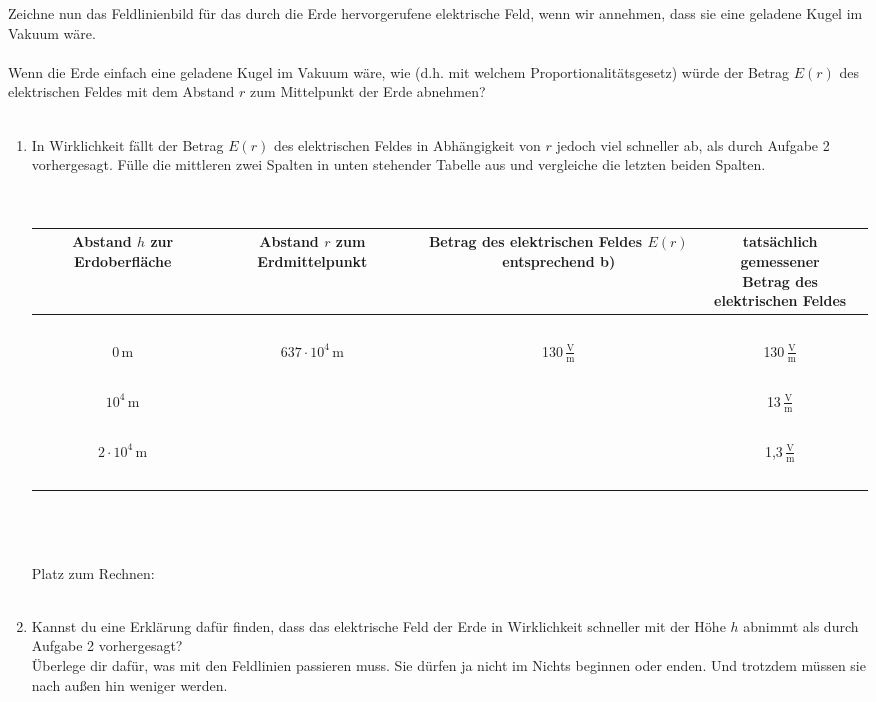 \documentclass[task=1]{exercise}
\begin{document}
  
  Zeichne nun das Feldlinienbild für das durch die Erde hervorgerufene elektrische Feld, wenn wir annehmen, dass sie eine geladene Kugel im Vakuum wäre.\\
  \vspace{4cm}~\\
  \task[Proportionalitätsgesetz]
  Wenn die Erde einfach eine geladene Kugel im Vakuum wäre, wie (d.h. mit welchem Proportionalitätsgesetz) würde der Betrag $E(r)$ des elektrischen Feldes mit dem Abstand $r$ zum Mittelpunkt der Erde abnehmen?\\
  \vspace{1cm}~\\
  \newpage
  \begin{enumerate}
  \item In Wirklichkeit fällt der Betrag $E(r)$ des elektrischen Feldes in Abhängigkeit von $r$ jedoch viel schneller ab, als durch Aufgabe 2 vorhergesagt. Fülle die mittleren zwei Spalten in unten stehender Tabelle aus und vergleiche die letzten beiden Spalten.\\~\\~\\
  \begin{tabular}{ccccc}
    \shortstack{Abstand $h$ zur\\Erdoberfläche} & \shortstack{Abstand $r$ zum\\Erdmittelpunkt} & \shortstack{Betrag des\\elektrischen Feldes $E(r)$\\entsprechend b)} & \shortstack{tatsächlich gemessener\\Betrag des\\elektrischen Feldes}\\\hline~\\
    0\,m   & $637 \cdot 10^4$\,m & 130\,$\frac{\mathrm{V}}{\mathrm{m}}$ & 130\,$\frac{\mathrm{V}}{\mathrm{m}}$\\~\\
    $10^4$\,m  & & & 13\,$\frac{\mathrm{V}}{\mathrm{m}}$\\~\\
    $2\cdot 10^4$\,m  & & & 1,3\,$\frac{\mathrm{V}}{\mathrm{m}}$\\~\\\hline
  \end{tabular}~\\~\\~\\
  Platz zum Rechnen:\\\vspace{5cm}\\
  \item Kannst du eine Erklärung dafür finden, dass das elektrische Feld der Erde in Wirklichkeit schneller mit der Höhe $h$ abnimmt als durch Aufgabe 2 vorhergesagt?\\
  Überlege dir dafür, was mit den Feldlinien passieren muss. Sie dürfen ja nicht im Nichts beginnen oder enden. Und trotzdem müssen sie nach außen hin weniger werden.
  \end{enumerate}
  
\end{document}
